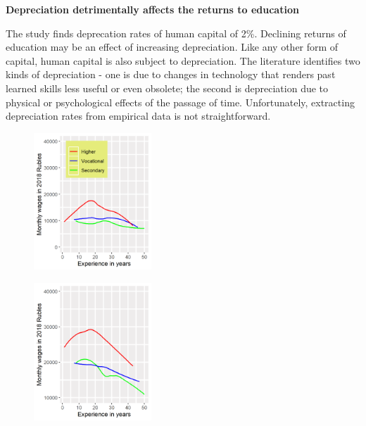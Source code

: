 \documentclass[alpha-refs]{wiley-article-04t}
\begin{document}
\hspace{-1.75em} \textbf{Depreciation detrimentally affects the returns to 
education}

The study finds deprecation rates of human capital of 2\%. Declining 
returns of  education may be an effect of increasing depreciation. Like any 
other form of capital, human capital is also subject to depreciation. The 
literature identifies two kinds of depreciation - one is due to changes in 
technology that renders past learned skills less useful or even obsolete; 
the second is depreciation due to physical or psychological effects of the 
passage of time. Unfortunately, extracting depreciation rates from 
empirical data is not straightforward.


\begin{figure}[htbp!]
	\hspace{0.35in}
	\begin{minipage}[b]{.3\linewidth}
		\centering
		\hspace*{-0.7in}
		\includegraphics[width=125pt]{dp01_98.png}
		\label{fig:1.2a}
	\end{minipage}
	\hfill
	\begin{minipage}[b]{.3\linewidth}
		\centering
		\hspace*{-0.7in}
		\includegraphics[width=125pt]{dp01_06.png}
		\label{fig:1.2b}
	\end{minipage}
	\hfill
	\begin{minipage}[b]{.3\linewidth}
		\centering

\end{minipage}
\end{figure}
\end{document}
